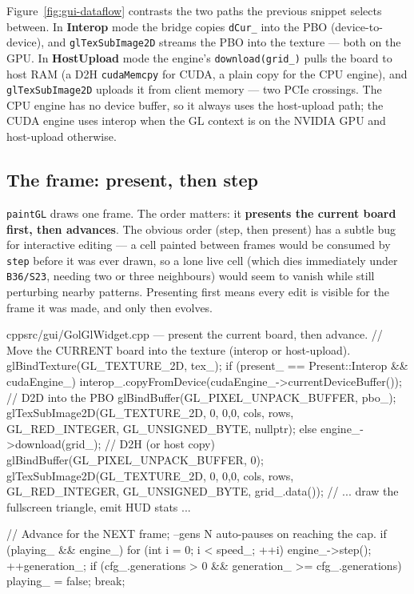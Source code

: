 \documentclass[
	english,
	letterpaper, oneside
]{article}
\begin{document}
Figure~\ref{fig:gui-dataflow} contrasts the two paths the previous snippet selects
between. In \textbf{Interop} mode the bridge copies \texttt{dCur\_} into the PBO
(device-to-device), and \texttt{glTexSubImage2D} streams the PBO into the texture
--- both on the GPU. In \textbf{HostUpload} mode the engine's
\texttt{download(grid\_)} pulls the board to host RAM (a D2H \texttt{cudaMemcpy}
for CUDA, a plain copy for the CPU engine), and \texttt{glTexSubImage2D} uploads
it from client memory --- two PCIe crossings. The CPU engine has no device buffer,
so it always uses the host-upload path; the CUDA engine uses interop when the GL
context is on the NVIDIA GPU and host-upload otherwise.


\subsection{The frame: present, then step}
\label{sec:gui-frame}

\texttt{paintGL} draws one frame. The order matters: it \textbf{presents the
current board first, then advances}. The obvious order (step, then present) has a
subtle bug for interactive editing --- a cell painted between frames would be
consumed by \texttt{step} before it was ever drawn, so a lone live cell (which dies
immediately under \texttt{B36/S23}, needing two or three neighbours) would seem to
vanish while still perturbing nearby patterns. Presenting first means every edit
is visible for the frame it was made, and only then evolves.

\begin{sourcecode}{cpp}{src/gui/GolGlWidget.cpp --- present the current board, then advance.}
// Move the CURRENT board into the texture (interop or host-upload).
glBindTexture(GL_TEXTURE_2D, tex_);
if (present_ == Present::Interop && cudaEngine_) {
  interop_.copyFromDevice(cudaEngine_->currentDeviceBuffer());   // D2D into the PBO
  glBindBuffer(GL_PIXEL_UNPACK_BUFFER, pbo_);
  glTexSubImage2D(GL_TEXTURE_2D, 0, 0,0, cols, rows, GL_RED_INTEGER, GL_UNSIGNED_BYTE, nullptr);
} else {
  engine_->download(grid_);                                      // D2H (or host copy)
  glBindBuffer(GL_PIXEL_UNPACK_BUFFER, 0);
  glTexSubImage2D(GL_TEXTURE_2D, 0, 0,0, cols, rows, GL_RED_INTEGER, GL_UNSIGNED_BYTE, grid_.data());
}
// ... draw the fullscreen triangle, emit HUD stats ...

// Advance for the NEXT frame; --gens N auto-pauses on reaching the cap.
if (playing_ && engine_)
  for (int i = 0; i < speed_; ++i) {
    engine_->step(); ++generation_;
    if (cfg_.generations > 0 && generation_ >= cfg_.generations) { playing_ = false; break; }
  }
\end{sourcecode}
\end{document}
